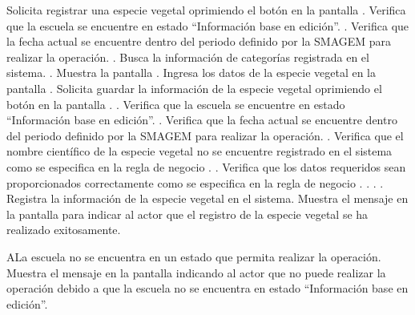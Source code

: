  \begin{UCtrayectoria}
    \UCpaso[\UCactor] Solicita registrar una especie vegetal oprimiendo el botón  en la pantalla .
    \UCpaso[\UCsist] Verifica que la escuela se encuentre en estado ``Información base en edición''. .
    \UCpaso[\UCsist] Verifica que la fecha actual se encuentre dentro del periodo definido por la SMAGEM para realizar la operación. .
    \UCpaso[\UCsist] Busca la información de categorías registrada en el sistema. .
    \UCpaso[\UCsist] Muestra la pantalla .
    \UCpaso[\UCactor] Ingresa los datos de la especie vegetal en la pantalla . \label{cuibb7:Registrar}
    \UCpaso[\UCactor] Solicita guardar la información de la especie vegetal oprimiendo el botón  en la pantalla . .
        \UCpaso[\UCsist] Verifica que la escuela se encuentre en estado ``Información base en edición''. .
    \UCpaso[\UCsist] Verifica que la fecha actual se encuentre dentro del periodo definido por la SMAGEM para realizar la operación. .
    \UCpaso[\UCsist] Verifica que el nombre científico de la especie vegetal no se encuentre registrado en el sistema como se especifica en la regla de negocio . .
    \UCpaso[\UCsist] Verifica que los datos requeridos sean proporcionados correctamente como se especifica en la regla de negocio . . . .
    \UCpaso[\UCsist] Registra la información de la especie vegetal en el sistema.
    \UCpaso[\UCsist] Muestra el mensaje  en la pantalla  para indicar al actor que el registro de la especie vegetal se ha realizado exitosamente. 
    
 \end{UCtrayectoria}
 
    \begin{UCtrayectoriaA}{A}{La escuela no se encuentra en un estado que permita realizar la operación.}
    \UCpaso[\UCsist] Muestra el mensaje  en la pantalla  indicando al actor que no puede realizar la operación debido a que la escuela no se encuentra en estado ``Información base en edición''. 
 \end{UCtrayectoriaA}

